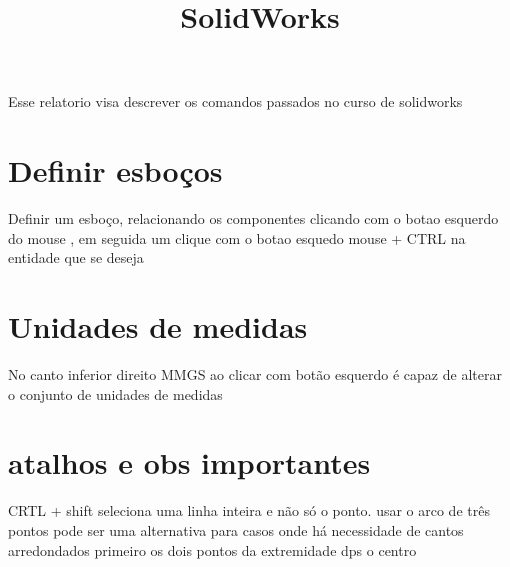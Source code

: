 \documentclass[16pt]{article}
\date{}
\title{SolidWorks}
\begin{document}
\maketitle
Esse relatorio visa descrever os comandos passados no curso de solidworks
\section{Definir esboços}
Definir um esboço, relacionando os componentes clicando com o botao esquerdo do mouse , em seguida um clique com o botao esquedo  mouse  + CTRL na entidade que se deseja 
\section{Unidades de medidas}
No canto inferior direito MMGS ao clicar com botão esquerdo é capaz de alterar o conjunto de unidades de medidas
\section{atalhos e obs importantes}
CRTL + shift seleciona uma linha inteira e não só o ponto.
usar o arco de três pontos pode ser uma alternativa para casos onde há necessidade de cantos arredondados
primeiro os dois pontos da extremidade dps o centro
\end{document}
